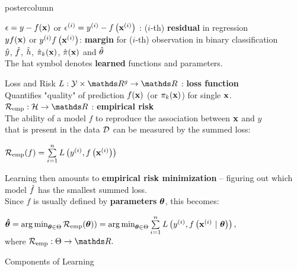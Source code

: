 \documentclass{beamer}
\begin{document}
\begin{frame}[fragile]{}
\begin{columns}
\begin{column}{.31\textwidth}
\begin{beamercolorbox}[center]{postercolumn}
\begin{minipage}{.98\textwidth}
{\begin{myblock}{}
$\epsilon = y - f(\mathbf{x})$ or $\epsilon^{(i)} = y^{(i)} - f\left(\mathbf{x}^{(i)}\right)$ : ($i$-th) \textbf{residual} in regression\\

$y f(\mathbf{x})$ or $y^{(i)} f\left(\mathbf{x}^{(i)}\right)$: \textbf{margin} for ($i$-th) observation in binary classification\\%

$\hat{y}$, $\hat{f}$, $\hat{h}$, $\hat \pi_{k}(\mathbf{x})$, $\hat \pi(\mathbf{x})$ and $\hat{\theta}$ \\
The hat symbol denotes \textbf{learned} functions and parameters.
\end{myblock}
\begin{myblock}{Loss and Risk}
  $L: \Yspace \times \R^g \to \R$ : \textbf{loss function} \\
 Quantifies "quality" of prediction $f(\mathbf{x})$ (or $\pi_{k}(\mathbf{x})$) for single $\mathbf{x}$. \\
  
  $\riske:  \Hspace \to \R $ : \textbf{empirical risk } \\
The ability of a model $f$ to reproduce the association between $\mathbf{x}$ and $y$ \\
that is present in the data $\mathcal{D}$ can be measured by the summed loss:
  
\begin{center}
  $\mathcal{R}_{\text{emp}}(f) = \sum\limits_{i=1}^n L\left(y^{(i)}, f\left(\mathbf{x}^{(i)}\right)\right)$ 
\end{center}  

  
Learning then amounts to \textbf{empirical risk minimization} -- figuring out which model $\hat{f}$ has the smallest summed loss. \\ 
Since $f$ is usually defined by \textbf{parameters} $\bm{\theta}$, this becomes:

\begin{center}
$\bm{\hat\theta} = \operatorname{arg\,min}_{\bm{\theta} \in \Theta} \mathcal{R}_{\text{emp}}(\bm{\theta})) = \operatorname{arg\,min}_{\bm{\theta} \in \Theta} \sum\limits_{i=1}^n L\left(y^{(i)}, f\left(\mathbf{x}^{(i)} ~|~ \bm{\theta}\right)\right),$ \\
where $\riske : \Theta \to \R.$
\end{center}

\end{myblock}
\begin{myblock}{Components of Learning}


\end{myblock}}
\end{minipage}
\end{beamercolorbox}
\end{column}
\end{columns}
\end{frame}
\end{document}
